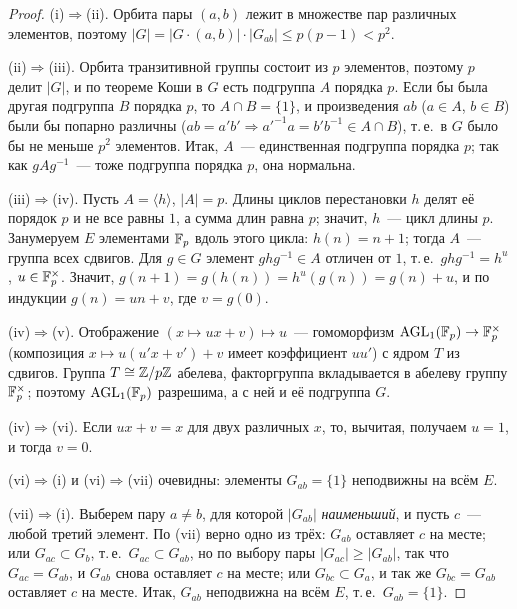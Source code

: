 \begin{proof}
(i)$\Rightarrow$(ii). Орбита пары $(a,b)$ лежит в множестве пар различных элементов, поэтому
$|G|=|G\cdot(a,b)|\cdot|G_{ab}|\le p(p-1)<p^2$.

(ii)$\Rightarrow$(iii). Орбита транзитивной группы состоит из $p$ элементов, поэтому $p$ делит $|G|$, и по теореме
Коши в $G$ есть подгруппа $A$ порядка $p$. Если бы была другая подгруппа $B$ порядка $p$, то $A\cap B=\{1\}$, и
произведения $ab$ ($a\in A$, $b\in B$) были бы попарно различны ($ab=a'b'\Rightarrow a'^{-1}a=b'b^{-1}\in A\cap B$), т.\,е.\ в
$G$ было бы не меньше $p^2$ элементов. Итак, $A$~--- единственная подгруппа порядка $p$; так как $gAg^{-1}$~--- тоже
подгруппа порядка $p$, она нормальна.

(iii)$\Rightarrow$(iv). Пусть $A=\langle h\rangle$, $|A|=p$. Длины циклов перестановки $h$ делят её порядок $p$ и не все равны
$1$, а сумма длин равна $p$; значит, $h$~--- цикл длины $p$. Занумеруем $E$ элементами $\mathbb F_p$ вдоль этого цикла: $h(n)=n+1$;
тогда $A$~--- группа всех сдвигов. Для $g\in G$ элемент $ghg^{-1}\in A$ отличен от $1$, т.\,е.\ $ghg^{-1}=h^u$, $u\in\mathbb F_p^\times$.
Значит, $g(n+1)=g(h(n))=h^u(g(n))=g(n)+u$, и по индукции $g(n)=un+v$, где $v=g(0)$.

(iv)$\Rightarrow$(v). Отображение $(x\mapsto ux+v)\mapsto u$~--- гомоморфизм $\mathrm{AGL}_1(\mathbb F_p)\to\mathbb F_p^\times$ (композиция
$x\mapsto u(u'x+v')+v$ имеет коэффициент $uu'$) с ядром $T$ из сдвигов. Группа $T\cong\mathbb Z/p\mathbb Z$ абелева, факторгруппа
вкладывается в абелеву группу $\mathbb F_p^\times$; поэтому $\mathrm{AGL}_1(\mathbb F_p)$ разрешима, а с ней и её подгруппа $G$.

(iv)$\Rightarrow$(vi). Если $ux+v=x$ для двух различных $x$, то, вычитая, получаем $u=1$, и тогда $v=0$.

(vi)$\Rightarrow$(i) и (vi)$\Rightarrow$(vii) очевидны: элементы $G_{ab}=\{1\}$ неподвижны на всём $E$.

(vii)$\Rightarrow$(i). Выберем пару $a\ne b$, для которой $|G_{ab}|$ \emph{наименьший}, и пусть $c$~--- любой третий элемент.
По (vii) верно одно из трёх: $G_{ab}$ оставляет $c$ на месте; или $G_{ac}\subset G_b$, т.\,е.\ $G_{ac}\subset G_{ab}$, но по выбору
пары $|G_{ac}|\ge|G_{ab}|$, так что $G_{ac}=G_{ab}$, и $G_{ab}$ снова оставляет $c$ на месте; или $G_{bc}\subset G_a$, и
так же $G_{bc}=G_{ab}$ оставляет $c$ на месте. Итак, $G_{ab}$ неподвижна на всём $E$, т.\,е.\ $G_{ab}=\{1\}$.


\end{proof}
